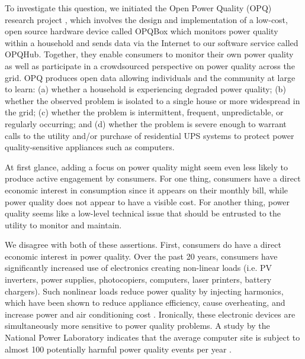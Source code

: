 To investigate this question, we initiated the Open Power Quality (OPQ) research project \cite{opq-site}, which involves the design and implementation of a low-cost, open source hardware device called OPQBox which monitors power quality within a household and sends data via the Internet to our software service called OPQHub. Together, they enable consumers to monitor their own power quality as well as participate in a crowdsourced perspective on power quality across the grid.  OPQ produces open data allowing individuals and the community at large to learn: (a) whether a household is experiencing degraded power quality; (b) whether the observed problem is isolated to a single house or more widespread in the grid;  (c) whether the problem is intermittent, frequent, unpredictable, or regularly occurring;  and (d) whether the problem is severe enough to warrant calls to the utility and/or purchase of residential UPS systems to protect power quality-sensitive appliances such as computers. 


At first glance, adding a focus on power quality might seem even less likely to produce active engagement by consumers. For one thing, consumers have a direct economic interest in consumption since it appears on their monthly bill, while power quality does not appear to have a visible cost.  For another thing, power quality seems like a low-level technical issue that should be entrusted to the utility to monitor and maintain. 

We disagree with both of these assertions. First, consumers do have a direct economic interest in power quality. Over the past 20 years, consumers have significantly increased use of electronics creating non-linear loads (i.e. PV inverters, power supplies, photocopiers, computers, laser printers, battery chargers). Such nonlinear loads reduce power quality by injecting harmonics, which have been shown to reduce appliance efficiency, cause overheating, and increase power and air conditioning cost \cite{Rodriguez2010}. Ironically, these electronic devices are simultaneously more sensitive to power quality problems. A study by the National Power Laboratory indicates that the average computer site is subject to almost 100 potentially harmful power quality events per year \cite{Dorr1992}.

